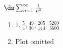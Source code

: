 {$\ds \sum_{n=1}^\infty \frac{1}{n^2}$
}
{\begin{enumerate}
\item	$1,\frac{5}{4},\frac{49}{36},\frac{205}{144},\frac{526
   9}{3600}$
\item	Plot omitted
\end{enumerate}
}
